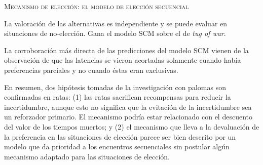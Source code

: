 \documentclass[a4paper,12pt]{article}
\begin{document}
{\scshape Mecanismo de elección: el modelo de elección secuencial}

La valoración de las alternativas es independiente y se puede evaluar en situaciones de no-elección. Gana el modelo SCM sobre el de {\itshape tug of war}.

La corroboración más directa de las predicciones del modelo SCM vienen de la observación de que las latencias se vieron acortadas solamente cuando había preferencias parciales y no cuando éstas eran exclusivas.

En resumen, dos hipótesis tomadas de la investigación con palomas son confirmadas en ratas: (1) las ratas sacrifican recompensas para reducir la incertidumbre, aunque esto no significa que la evitación de la incertidumbre sea un reforzador primario. El mecanismo podría estar relacionado con el descuento del valor de los tiempos muertos; y (2) el mecanismo que lleva a la devaluación de la preferencia en las situaciones de elección parece ser bien descrito por un modelo que da prioridad a los encuentros secuenciales sin postular algún mecanismo adaptado para las situaciones de elección.
\end{document}
